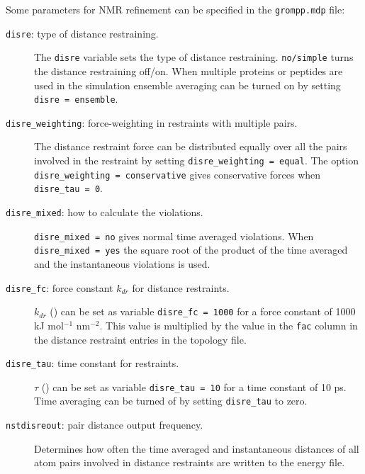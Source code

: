 Some parameters for NMR refinement can be specified in the
{\tt grompp.mdp} file:
\begin{description}
\item[{\tt disre}: type of distance restraining.]
	The {\tt disre} variable sets the type of distance restraining.
	{\tt no/simple} turns the distance restraining off/on.
 	When multiple proteins or peptides are used
	in the simulation ensemble averaging 
	can be turned on by setting {\tt disre = ensemble}.
\item[{\tt disre\_weighting}: force-weighting in restraints with
	 multiple pairs.]
	The distance restraint force can be distributed equally
	over all the pairs involved in the restraint by setting
	{\tt disre\_weighting = equal}.
	The option {\tt disre\_weighting = conservative}
	gives conservative forces when {\tt disre\_tau = 0}.
\item[{\tt disre\_mixed}: how to calculate the violations.]
	{\tt disre\_mixed = no} gives normal time averaged violations.
	When {\tt disre\_mixed = yes} the square root of the
	product of the time averaged and the instantaneous
	violations is used.
\item[{\tt disre\_fc}: force constant $k_{dr}$ for distance restraints.] 
	$k_{dr}$  () can be set
	as variable {\tt disre\_fc = 1000} for a force constant of
	1000 {kJ mol$^{-1}$ nm$^{-2}$}. This value is multiplied by
	the value in the {\tt fac} column in the distance restraint
	entries in the topology file.
\item[{\tt disre\_tau}: time constant for restraints.] 
	$\tau$ () can be set
	as variable {\tt disre\_tau = 10} for a time constant of
	10 ps. Time averaging can be turned of by setting {\tt disre\_tau}
	to zero.
\item[{\tt nstdisreout}: pair distance output frequency.]
	Determines how often the time averaged and 
	instantaneous distances of all atom pairs involved in
	distance restraints are written to the energy file.
\end{description}

